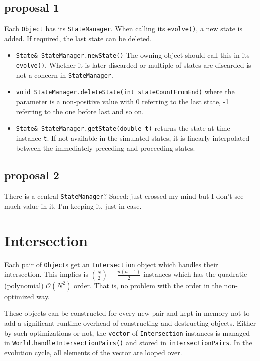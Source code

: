 \documentclass[a4paper]{report}
\newcommand{\cm}[1]{{\color{red}#1}}
\begin{document}
\section{proposal 1}
Each \verb+Object+ has its \verb+StateManager+. When calling its \verb+evolve()+, a new state is added. If required, the last state can be deleted. 

\begin{itemize}
	\item \verb+State& StateManager.newState()+ The owning object should call this in its \verb+evolve()+. Whether it is later discarded or multiple of states are discarded is not a concern in \verb+StateManager+.
	\item \verb+void StateManager.deleteState(int stateCountFromEnd)+ where the parameter is a non-positive value with 0 referring to the last state, -1 referring to the one before last and so on.
\item \verb+State& StateManager.getState(double t)+ returns the state at time instance \verb+t+. If not available in the simulated states, it is linearly interpolated between the immediately preceding and proceeding states.
\end{itemize}

\section{proposal 2}
There is a central \verb+StateManager+? \cm{Saeed: just crossed my mind but I don't see much value in it. I'm keeping it, just in case.}


\chapter{Intersection}
\label{chap:intersection}
Each pair of \verb+Object+s get an \verb+Intersection+ object which handles their intersection.  This implies is $\binom{N}{2}=\frac{n(n-1)}{2}$ instances which has the quadratic (polynomial) $\mathcal{O}(N^2)$ order. That is, no problem with the order in the non-optimized way.

These objects can be constructed for every new pair and kept in memory not to add a significant runtime overhead of constructing and destructing objects. Either by such optimizations or not, the \verb+vector+ of \verb+Intersection+ instances is managed in \verb+World.handleIntersectionPairs()+ and stored in \verb+intersectionPairs+. In the evolution cycle, all elements of the vector are looped over. 
\end{document}
